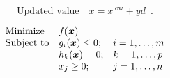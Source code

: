 \documentclass[a4paper]{article}
\begin{document}
    \begin{equation*}
        \mbox{Updated value}\quad x =
        x^\mathrm{low} + yd \enspace .
    \end{equation*}

    \begin{equation*}
        \begin{array}{lll}
        \mbox{Minimize}
        & f(\mbox{\boldmath{$x$}}) &\\
        \mbox{Subject to}
        & g_i(\mbox{\boldmath{$x$}}) \leq 0 ; &
        i=1,\ldots,m\\
        & h_k(\mbox{\boldmath{$x$}}) = 0 ; &
        k=1,\ldots,p\\
        & x_j \geq 0 ; & j=1,\ldots,n
        \end{array}
    \end{equation*}
\end{document}
